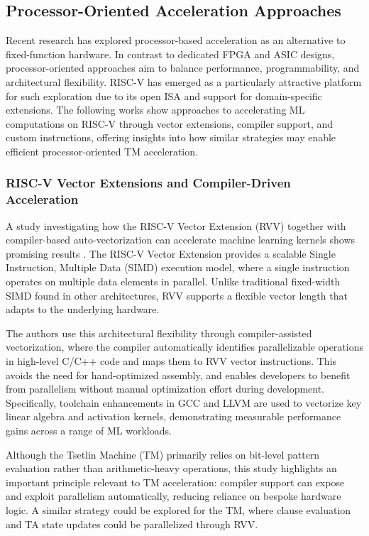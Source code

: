 \subsection{Processor-Oriented Acceleration Approaches}

Recent research has explored processor-based acceleration as an alternative to fixed-function hardware. 
In contrast to dedicated FPGA and ASIC designs, processor-oriented approaches aim to balance performance, programmability, and architectural flexibility. 
RISC-V has emerged as a particularly attractive platform for such exploration due to its open ISA and support for domain-specific extensions. The following works show approaches to accelerating ML computations on RISC-V through vector extensions, compiler support, and custom instructions, offering insights into how similar strategies may enable efficient processor-oriented TM acceleration.


\subsubsection{RISC-V Vector Extensions and Compiler-Driven Acceleration}

A study investigating how the RISC-V Vector Extension (RVV) together with compiler-based auto-vectorization can accelerate machine learning kernels shows promising results \cite{NunesWillianAnaldo2025AMLw}. The RISC-V Vector Extension provides a scalable Single Instruction, Multiple Data (SIMD) execution model, where a single instruction operates on multiple data elements in parallel. Unlike traditional fixed-width SIMD found in other architectures, RVV supports a flexible vector length that adapts to the underlying hardware.

The authors use this architectural flexibility through compiler-assisted vectorization, where the compiler automatically identifies parallelizable operations in high-level C/C++ code and maps them to RVV vector instructions. This avoids the need for hand-optimized assembly, and enables developers to benefit from parallelism without manual optimization effort during development. Specifically, toolchain enhancements in GCC and LLVM are used to vectorize key linear algebra and activation kernels, demonstrating measurable performance gains across a range of ML workloads.

Although the Tsetlin Machine (TM) primarily relies on bit-level pattern evaluation rather than arithmetic-heavy operations, this study highlights an important principle relevant to TM acceleration: compiler support can expose and exploit parallelism automatically, reducing reliance on bespoke hardware logic. A similar strategy could be explored for the TM, where clause evaluation and TA state updates could be parallelized through RVV.


